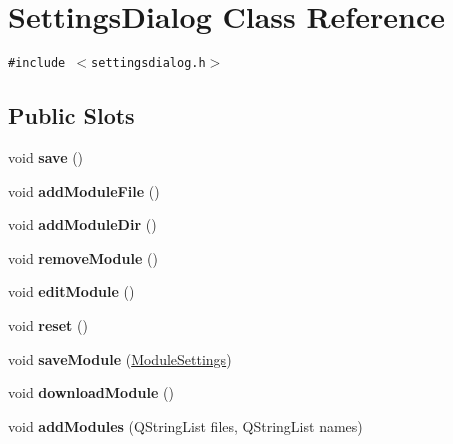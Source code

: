 \hypertarget{classSettingsDialog}{
\section{SettingsDialog Class Reference}
\label{classSettingsDialog}
}
{\tt \#include $<$settingsdialog.h$>$}

\subsection*{Public Slots}
\begin{CompactItemize}
\item 
\hypertarget{classSettingsDialog_dea5c3242cbad78dfc8d9948d2a265de}{
void \textbf{save} ()}
\label{classSettingsDialog_dea5c3242cbad78dfc8d9948d2a265de}

\item 
\hypertarget{classSettingsDialog_081503f4834e7a8ce54ac2d01f9b61b2}{
void \textbf{addModuleFile} ()}
\label{classSettingsDialog_081503f4834e7a8ce54ac2d01f9b61b2}

\item 
\hypertarget{classSettingsDialog_5416feca0f8183ab304c5c484a2e69b1}{
void \textbf{addModuleDir} ()}
\label{classSettingsDialog_5416feca0f8183ab304c5c484a2e69b1}

\item 
\hypertarget{classSettingsDialog_e27991e987832e86da7dc05621a9e400}{
void \textbf{removeModule} ()}
\label{classSettingsDialog_e27991e987832e86da7dc05621a9e400}

\item 
\hypertarget{classSettingsDialog_76fa3919cf0f15111e375833ece48517}{
void \textbf{editModule} ()}
\label{classSettingsDialog_76fa3919cf0f15111e375833ece48517}

\item 
\hypertarget{classSettingsDialog_51de698192c7c809e92221fcbffaf642}{
void \textbf{reset} ()}
\label{classSettingsDialog_51de698192c7c809e92221fcbffaf642}

\item 
\hypertarget{classSettingsDialog_81e0592cf638ac19d0a91f08c3b98df6}{
void \textbf{saveModule} (\hyperlink{classModuleSettings}{ModuleSettings})}
\label{classSettingsDialog_81e0592cf638ac19d0a91f08c3b98df6}

\item 
\hypertarget{classSettingsDialog_14cc2b79fda96032f2e1ca626b6e3efc}{
void \textbf{downloadModule} ()}
\label{classSettingsDialog_14cc2b79fda96032f2e1ca626b6e3efc}

\item 
\hypertarget{classSettingsDialog_2b94d87ae080b290631d3379b9e9bf58}{
void \textbf{addModules} (QStringList files, QStringList names)}
\label{classSettingsDialog_2b94d87ae080b290631d3379b9e9bf58}

\end{CompactItemize}
